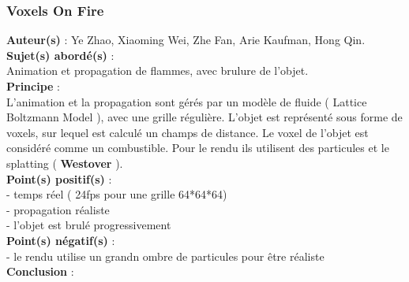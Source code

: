\documentclass[a4paper,10pt]{article}
\begin{document}
\subsubsection{Voxels On Fire}
\textbf{Auteur(s)} : Ye Zhao, Xiaoming Wei, Zhe Fan, Arie Kaufman, Hong Qin.\\
\textbf{Sujet(s) abordé(s)} : \\  Animation et propagation de flammes, avec brulure de l'objet.\\
\textbf{Principe} :\\ L'animation et la propagation sont gérés par un modèle de fluide ( Lattice Boltzmann Model ), avec une grille régulière. L'objet est représenté sous forme de voxels, sur lequel est calculé un champs de distance. Le voxel de l'objet est considéré comme un combustible. Pour le rendu ils utilisent des particules et le splatting ( \textbf{Westover} ).\\
\textbf{Point(s) positif(s)} :\\
    - temps réel ( 24fps pour une grille 64*64*64)\\
    - propagation réaliste\\
    - l'objet est brulé progressivement\\
\textbf{Point(s) négatif(s)} :\\
    - le rendu utilise un grandn ombre de particules pour être réaliste\\
\textbf{Conclusion} :\\
\end{document}
